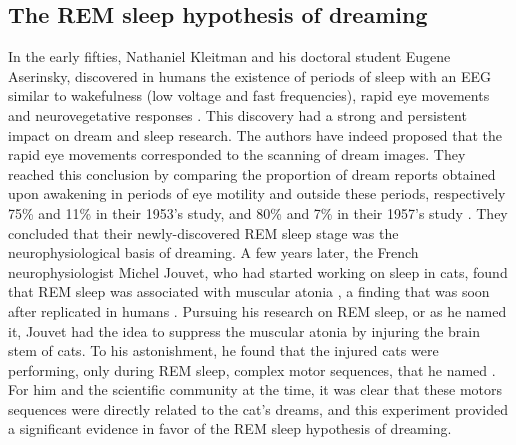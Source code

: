 \subsection{The REM sleep hypothesis of dreaming}
\label{sec:dream-research:link:rem-sleep}

In the early fifties, Nathaniel Kleitman and his doctoral student Eugene Aserinsky, discovered in humans the existence of periods of sleep with an EEG similar to wakefulness (low voltage and fast frequencies), rapid eye movements and neurovegetative responses \citep{aserinsky_regularly_1953}. This discovery had a strong and persistent impact on dream and sleep research. The authors have indeed proposed that the rapid eye movements corresponded to the scanning of dream images. They reached this conclusion by comparing the proportion of dream reports obtained upon awakening in periods of eye motility and outside these periods, respectively 75\% and 11\% in their 1953’s study, and 80\% and 7\% in their 1957's study \citep{dement_relation_1957}. They concluded that their newly-discovered REM sleep stage was the neurophysiological basis of dreaming. A few years later, the French neurophysiologist Michel Jouvet, who had started working on sleep in cats, found that REM sleep was associated with muscular atonia \citep{jouvet_sur_1959}, a finding that was soon after replicated in humans \citep{berger_tonus_1961}. Pursuing his research on REM sleep, or  as he named it, Jouvet had the idea to suppress the muscular atonia by injuring the brain stem of cats. To his astonishment, he found that the injured cats were performing, only during REM sleep, complex motor sequences, that he named  \citep{sastre_comportement_1979}. For him and the scientific community at the time, it was clear that these motors sequences were directly related to the cat's dreams, and this experiment provided a significant evidence in favor of the REM sleep hypothesis of dreaming.

